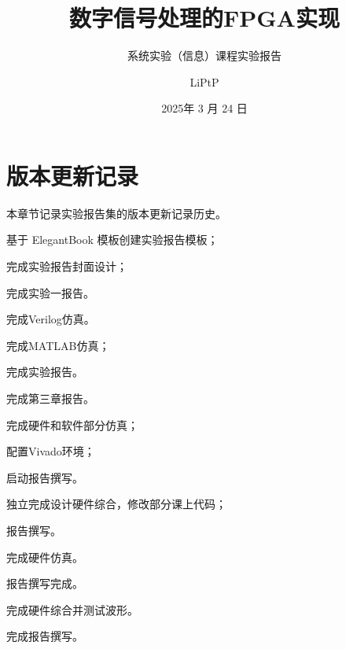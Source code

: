 \documentclass[lang=cn,newtx,10pt,scheme=chinese]{elegantbook}
\title{数字信号处理的FPGA实现}
\subtitle{系统实验（信息）课程实验报告}
\author{LiPtP}
\institute{吴健雄学院}
\date{2025年 3 月 24 日}
\begin{document}
\maketitle
\frontmatter

\tableofcontents

\mainmatter

% 

% 

% 

% 

% 


\appendix
\chapter{版本更新记录}
本章节记录实验报告集的版本更新记录历史。

\begin{change}
  \item 基于 ElegantBook 模板创建实验报告模板；
  \item 完成实验报告封面设计；
  \item 完成实验一报告。
\end{change}

\begin{change}
  \item 完成Verilog仿真。
\end{change}

\begin{change}
\item 完成MATLAB仿真；
\item 完成实验报告。
\end{change}

\begin{change}
\item 完成第三章报告。
\end{change}

\begin{change}
\item 完成硬件和软件部分仿真；
\item 配置Vivado环境；
\item 启动报告撰写。
\end{change}

\begin{change}
\item 独立完成设计硬件综合，修改部分课上代码；
\item 报告撰写。
\end{change}

\begin{change}
  \item 完成硬件仿真。
  \item 报告撰写完成。
\end{change}

\begin{change}
  \item 完成硬件综合并测试波形。
  \item 完成报告撰写。
\end{change}
\end{document}
